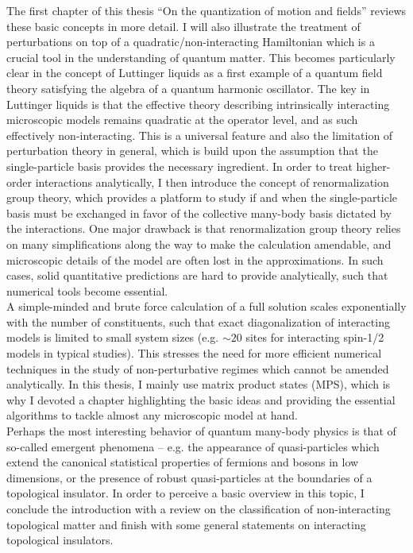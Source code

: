 The first chapter of this thesis ``On the quantization of motion and fields'' reviews these basic concepts in more detail.
I will also illustrate the treatment of perturbations on top of a quadratic/non-interacting Hamiltonian which is a crucial tool in the understanding of quantum matter.
This becomes particularly clear in the concept of Luttinger liquids as a first example of a quantum field theory satisfying the algebra of a quantum harmonic oscillator.
The key in Luttinger liquids is that the effective theory describing intrinsically interacting microscopic models remains quadratic at the operator level, and as such effectively non-interacting.
This is a universal feature and also the limitation of perturbation theory in general, which is build upon the assumption that the single-particle basis provides the necessary ingredient.
In order to treat higher-order interactions analytically, I then introduce the concept of renormalization group theory, which provides a platform to study if and when the single-particle basis must be exchanged in favor of the collective many-body basis dictated by the interactions.
One major drawback is that renormalization group theory relies on many simplifications along the way to make the calculation amendable, and microscopic details of the model are often lost in the approximations.
In such cases, solid quantitative predictions are hard to provide analytically, such that numerical tools become essential.
\\

A simple-minded and brute force calculation of a full solution scales exponentially with the number of constituents, such that exact diagonalization of interacting models is limited to small system sizes (e.g. $\sim 20$ sites for interacting spin-1/2 models in typical studies).
This stresses the need for more efficient numerical techniques in the study of non-perturbative regimes which cannot be amended analytically.
In this thesis, I mainly use matrix product states (MPS), which is why I devoted a chapter highlighting the basic ideas and providing the essential algorithms to tackle almost any microscopic model at hand.
\\

Perhaps the most interesting behavior of quantum many-body physics is that of so-called emergent phenomena -- e.g. the appearance of quasi-particles which extend the canonical statistical properties of fermions and bosons in low dimensions, or the presence of robust quasi-particles at the boundaries of a topological insulator.
In order to perceive a basic overview in this topic, I conclude the introduction with a review on the classification of non-interacting topological matter and finish with some general statements on interacting topological insulators.
\\

